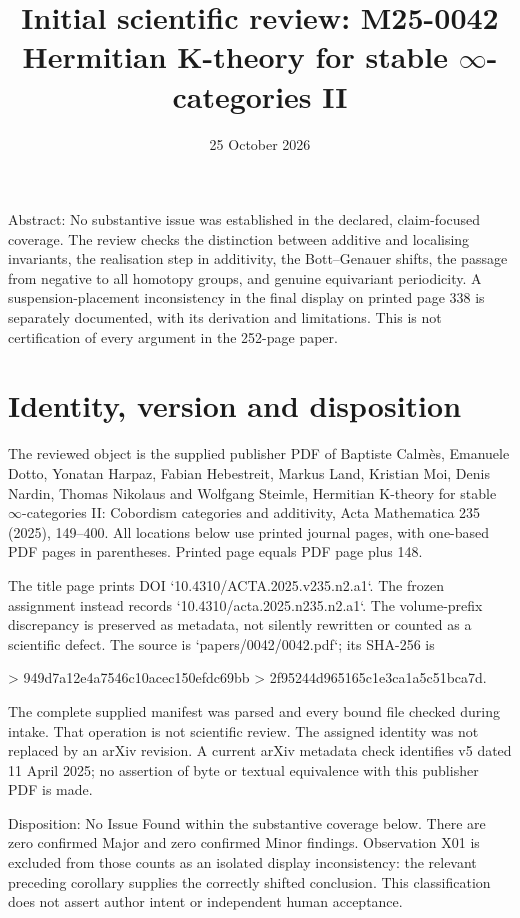 \documentclass[10pt]{article}
\title{Initial scientific review: M25-0042
Hermitian K-theory for stable \(\infty\)-categories II}
\author{}
\date{25 October 2026}
\begin{document}
\maketitle
Abstract: No substantive issue was established in the declared, claim-focused coverage. The review checks the distinction between additive and localising invariants, the realisation step in additivity, the Bott–Genauer shifts, the passage from negative to all homotopy groups, and genuine equivariant periodicity. A suspension-placement inconsistency in the final display on printed page 338 is separately documented, with its derivation and limitations. This is not certification of every argument in the 252-page paper.\par
\section*{Identity, version and disposition}
The reviewed object is the supplied publisher PDF of Baptiste Calmès, Emanuele Dotto, Yonatan Harpaz, Fabian Hebestreit, Markus Land, Kristian Moi, Denis Nardin, Thomas Nikolaus and Wolfgang Steimle, Hermitian K-theory for stable \(\infty\)-categories II: Cobordism categories and additivity, Acta Mathematica 235 (2025), 149–400. All locations below use printed journal pages, with one-based PDF pages in parentheses. Printed page equals PDF page plus 148.\par
The title page prints DOI `10.4310/ACTA.2025.v235.n2.a1`. The frozen assignment instead records `10.4310/acta.2025.n235.n2.a1`. The volume-prefix discrepancy is preserved as metadata, not silently rewritten or counted as a scientific defect. The source is `papers/0042/0042.pdf`; its SHA-256 is\par
> 949d7a12e4a7546c10acec150efdc69bb
> 2f95244d965165c1e3ca1a5c51bca7d.\par
The complete supplied manifest was parsed and every bound file checked during intake. That operation is not scientific review. The assigned identity was not replaced by an arXiv revision. A current arXiv metadata check identifies v5 dated 11 April 2025; no assertion of byte or textual equivalence with this publisher PDF is made.\par
Disposition: No Issue Found within the substantive coverage below. There are zero confirmed Major and zero confirmed Minor findings. Observation X01 is excluded from those counts as an isolated display inconsistency: the relevant preceding corollary supplies the correctly shifted conclusion. This classification does not assert author intent or independent human acceptance.\par
\end{document}
